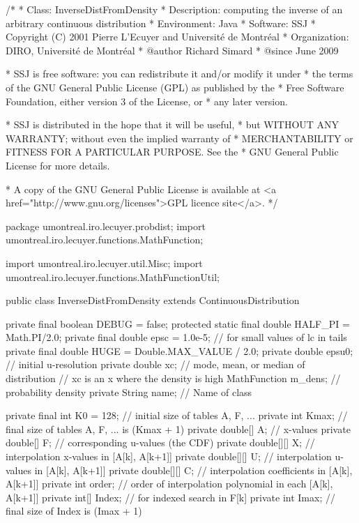 \begin{code}
\begin{hide}
/*
 * Class:        InverseDistFromDensity
 * Description:  computing the inverse of an arbitrary continuous distribution
 * Environment:  Java
 * Software:     SSJ 
 * Copyright (C) 2001  Pierre L'Ecuyer and Université de Montréal
 * Organization: DIRO, Université de Montréal
 * @author       Richard Simard
 * @since        June 2009

 * SSJ is free software: you can redistribute it and/or modify it under
 * the terms of the GNU General Public License (GPL) as published by the
 * Free Software Foundation, either version 3 of the License, or
 * any later version.

 * SSJ is distributed in the hope that it will be useful,
 * but WITHOUT ANY WARRANTY; without even the implied warranty of
 * MERCHANTABILITY or FITNESS FOR A PARTICULAR PURPOSE.  See the
 * GNU General Public License for more details.

 * A copy of the GNU General Public License is available at
   <a href="http://www.gnu.org/licenses">GPL licence site</a>.
 */
\end{hide}
package umontreal.iro.lecuyer.probdist;
   import umontreal.iro.lecuyer.functions.MathFunction;\begin{hide}
import umontreal.iro.lecuyer.util.Misc;
import umontreal.iro.lecuyer.functions.MathFunctionUtil;
\end{hide}


public class InverseDistFromDensity extends ContinuousDistribution \begin{hide} {
   private final boolean DEBUG = false;
   protected static final double HALF_PI = Math.PI/2.0;
   private final double epsc = 1.0e-5; // for small values of lc in tails
   private final double HUGE = Double.MAX_VALUE / 2.0;
   private double epsu0;      // initial u-resolution
   private double xc;         // mode, mean, or median of distribution
                              // xc is an x where the density is high
   MathFunction m_dens;       // probability density
   private String name;       // Name of class

   private final int K0 = 128;  // initial size of tables A, F, ...
   private int Kmax;          // final size of tables A, F, ... is (Kmax + 1)
   private double[] A;        // x-values
   private double[] F;        // corresponding u-values (the CDF)
   private double[][] X;      // interpolation x-values in [A[k], A[k+1]]
   private double[][] U;      // interpolation u-values in [A[k], A[k+1]]
   private double[][] C;      // interpolation coefficients in [A[k], A[k+1]]
   private int order;  // order of interpolation polynomial in each [A[k], A[k+1]]
   private int[] Index;       // for indexed search in F[k]
   private int Imax;          // final size of Index is (Imax + 1)

}
\end{hide}
\end{code}
